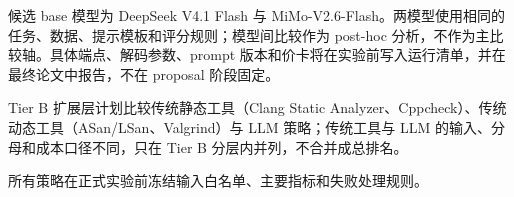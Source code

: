 \documentclass[conference]{IEEEtran}
\begin{document}
候选 base 模型为 DeepSeek V4.1 Flash 与 MiMo-V2.6-Flash。两模型使用相同的任务、数据、提示模板和评分规则；模型间比较作为 post-hoc 分析，不作为主比较轴。具体端点、解码参数、prompt 版本和价卡将在实验前写入运行清单，并在最终论文中报告，不在 proposal 阶段固定。

Tier B 扩展层计划比较传统静态工具（Clang Static Analyzer、Cppcheck）、传统动态工具（ASan/LSan、Valgrind）与 LLM 策略；传统工具与 LLM 的输入、分母和成本口径不同，只在 Tier B 分层内并列，不合并成总排名。

所有策略在正式实验前冻结输入白名单、主要指标和失败处理规则。



\end{document}
